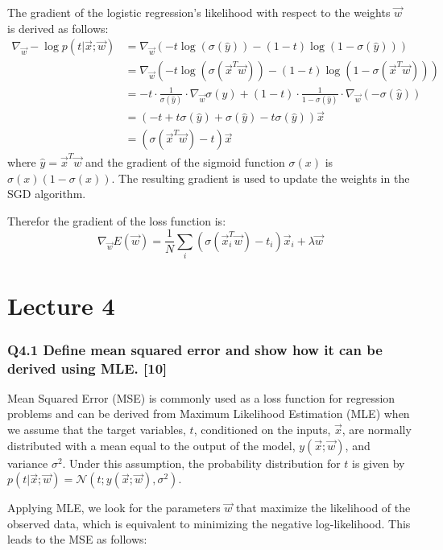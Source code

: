\documentclass[11pt]{article}
\begin{document}
The gradient of the logistic regression's likelihood with respect to the weights $\vec{w}$ is derived as follows:
\begin{align*}
\nabla_{\vec{w}} -\log p(t|\vec{x}; \vec{w}) &= \nabla_{\vec{w}} \left( -t \log (\sigma(\hat{y})) - (1-t) \log (1 - \sigma(\hat{y})) \right) \\
&= \nabla_{\vec{w}} \left( -t \log (\sigma(\vec{x}^T \vec{w})) - (1-t) \log (1 - \sigma(\vec{x}^T \vec{w})) \right) \\
&= -t \cdot \frac{1}{\sigma(\hat{y})} \cdot \nabla_{\vec{w}} \sigma(\hat{y}) + (1-t) \cdot \frac{1}{1 - \sigma(\hat{y})} \cdot \nabla_{\vec{w}} (-\sigma(\hat{y})) \\
&= \left( -t + t \sigma(\hat{y}) + \sigma(\hat{y}) - t \sigma(\hat{y}) \right) \vec{x} \\
&= \left( \sigma(\vec{x}^T \vec{w}) - t \right) \vec{x}
\end{align*}
where $\hat{y} = \vec{x}^T \vec{w}$ and the gradient of the sigmoid function $\sigma(x)$ is $\sigma(x)(1 - \sigma(x))$. The resulting gradient is used to update the weights in the SGD algorithm.

Therefor the gradient of the loss function is:
\[
\nabla_{\vec{w}} E(\vec{w}) = \frac{1}{N} \sum_{i} \left( \sigma(\vec{x}_i^T \vec{w}) - t_i \right) \vec{x}_i + \lambda \vec{w}
\]


\part{Lecture 4}
\section{Q4.1 Define mean squared error and show how it can be derived using MLE. [10]}

Mean Squared Error (MSE) is commonly used as a loss function for regression problems and can be derived from Maximum Likelihood Estimation (MLE) when we assume that the target variables, \( t \), conditioned on the inputs, \( \vec{x} \), are normally distributed with a mean equal to the output of the model, \( y(\vec{x}; \vec{w}) \), and variance \( \sigma^2 \). Under this assumption, the probability distribution for \( t \) is given by \( p(t|\vec{x}; \vec{w}) = \mathcal{N}(t; y(\vec{x}; \vec{w}), \sigma^2) \).

Applying MLE, we look for the parameters \( \vec{w} \) that maximize the likelihood of the observed data, which is equivalent to minimizing the negative log-likelihood. This leads to the MSE as follows:
\end{document}

